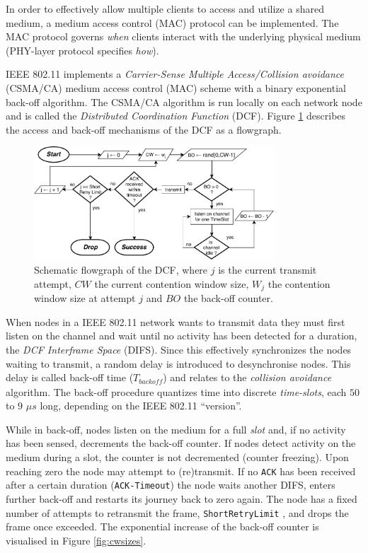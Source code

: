 In order to effectively allow multiple clients to access and utilize a shared
medium, a medium access control (MAC) protocol can be implemented. The MAC
protocol governs \emph{when} clients interact with the underlying physical
medium (PHY-layer protocol specifies \emph{how}).

IEEE 802.11 implements a \emph{Carrier-Sense Multiple Access/Collision
avoidance} (CSMA/CA) medium access control (MAC) scheme with a binary
exponential back-off algorithm. The CSMA/CA algorithm is run locally on each
network node and is called the \emph{Distributed Coordination Function} (DCF).
Figure \ref{fig:dcfgraph} describes the access and back-off mechanisms of the
DCF as a flowgraph.

\begin{figure}
\center
\includegraphics[width=0.8\textwidth]{images/ieee-80211-dcf.pdf}
\caption{Schematic flowgraph of the DCF, where $j$ is the current transmit attempt, $CW$ the current contention window size, $W_j$ the contention window size at attempt $j$ and $BO$ the back-off counter.}
\label{fig:dcfgraph}
\end{figure}


When nodes in a IEEE 802.11 network wants to transmit data they must first
listen on the channel and wait until no activity has been detected for a
duration, the \emph{DCF Interframe Space} (DIFS). Since this effectively
synchronizes the nodes waiting to transmit, a random delay is introduced to
desynchronise nodes. This delay is called back-off time
($T_{\mathit{backoff}}$) and relates to the \emph{collision avoidance}
algorithm. The back-off procedure quantizes time into discrete
\emph{time-slots}, each $50$ to $9$ $\mu s$ long, depending on the IEEE
802.11 ``version''.

While in back-off, nodes listen on the medium for a full \emph{slot} and, if
no activity has been sensed, decrements the back-off counter. If nodes detect
activity on the medium during a slot, the counter is not decremented (counter
freezing). Upon reaching zero the node may attempt to (re)transmit. If no
\texttt{ACK} has been received after a certain duration (\texttt{ACK-Timeout})
the node waits another DIFS, enters further back-off and restarts its journey
back to zero again. The node has a fixed number of attempts to retransmit the
frame, \texttt{ShortRetryLimit} \cite{654749}, and drops the frame once
exceeded. The exponential increase of the back-off counter is visualised in
Figure \ref{fig:cwsizes}.

